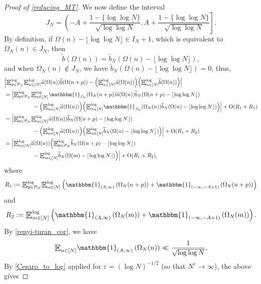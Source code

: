 \documentclass[letter,11pt]{article}
\theoremstyle{plain} %
\theoremstyle{definition} %
\theoremstyle{plain}
\theoremstyle{plain}
\theoremstyle{plain}
\numberwithin{equation}{section}
\newcommand{\Oh}{{\mathrm O}}
\renewcommand{\epsilon}{\varepsilon}
\newcommand{\E}{\raisebox{-0.4ex}{\scalebox{1.4}[1.3]{$\mathbb{E}$}}}
\newcommand{\Esub}[1]{\raisebox{-0.4ex}{\scalebox{1.4}[1.3]{$\mathbb{E}$}}\raisebox{-0.35ex}{\ensuremath{_{\scriptstyle #1}}}}
\newcommand{\logE}{{\E}^{\log}}
\newcommand{\1}{\mathbbm{1}}
\newcommand{\Pc}{\mathcal{P}}
\begin{document}
\begin{proof}[Proof of \cref{reducing_MT}]
We now define the interval 
$$J_N = \left(-A + \frac{1-\{\log\log{N}\}}{\sqrt{\log\log{N}}}, A + \frac{1-\{\log\log{N}\}}{\sqrt{\log\log{N}}}\right].$$
By definition, if $\Omega(n)-\lfloor\log\log{N}\rfloor\in I_N+1$,
which is equivalent to $\Omega_N(n)\in J_N$, then
$$\widetilde{b}(\Omega(n)) = \widetilde{b}_N(\Omega(n)-\lfloor\log\log{N}\rfloor),$$
and when $\Omega_N(n)\not\in J_N$, we have $\widetilde{b}_N(\Omega(n)-\lfloor\log\log{N}\rfloor) = 0$, 
thus,
\begin{align}\label{a_to_b}
     &\Big|\logE_{p\in\Pc_N}\logE_{n\in[N]} \widetilde{a}(\Omega(n))\widetilde{b}(\Omega(n+p)) - \Big(\logE_{n\in[N]}\widetilde{a}(\Omega(n))\Big)\Big(\logE_{n\in[N]}\widetilde{b}(\Omega(n))\Big)\Big| \notag \\
     & = \Big|\logE_{p\in\Pc_N}\logE_{n\in[N]}\1_{J_N}(\Omega_N(n+p))\widetilde{a}(\Omega(n))\widetilde{b}_N(\Omega(n+p)-\lfloor\log\log{N}\rfloor) \notag \\
     & \hspace*{1.8cm} - \Big(\logE_{n\in[N]}\widetilde{a}(\Omega(n))\Big)\Big(\logE_{n\in[N]}\1_{J_N}(\Omega_N(n))\widetilde{b}_N(\Omega(n)-\lfloor\log\log{N}\rfloor)\Big)\Big| 
     + \Oh(R_1 + R_2) \notag \\
     & = \Big|\logE_{p\in\Pc_N}\logE_{n\in[N]}\widetilde{a}(\Omega(n))\widetilde{b}_N(\Omega(n+p)-\lfloor\log\log{N}\rfloor) \notag \\
     & \hspace*{1.8cm} - \Big(\logE_{n\in[N]}\widetilde{a}(\Omega(n))\Big)\Big(\logE_{n\in[N]}\widetilde{b}_N(\Omega(n)-\lfloor\log\log{N}\rfloor)\Big)\Big| 
     + \Oh(R_1 + R_2) \notag \\
     & = \Big|\logE_{n\in[N]}\widetilde{a}(\Omega(n))\Big(\logE_{p\in\Pc_N}\widetilde{b}_N(\Omega(n+p)-\lfloor\log\log{N}\rfloor) \notag \\
     & \hspace*{1.8cm} - \logE_{m\in[N]}\widetilde{b}_N(\Omega(m)-\lfloor\log\log{N}\rfloor)\Big)\Big| + \Oh(R_1+R_2),
\end{align}
where 
$$R_1 := \logE_{p\in\Pc_N}\logE_{n\in[N]} \left(\1_{(A,\infty)}\left(\Omega_N(n+p)\right) + \1_{(-\infty,-A+1)}\left(\Omega_N(n+p)\right)\right)$$
and 
$$R_2 := \logE_{m\in[N]} \left(\1_{(A,\infty)}\left(\Omega_N(m)\right) + \1_{(-\infty,-A+1)}\left(\Omega_N(m)\right)\right).$$
By \cref{renyi-turan_cor}, we have 
$$\Esub{n\in[N]} \1_{(A,\infty)}\left(\Omega_N(n)\right) \ll \frac{1}{\sqrt{\log\log{N}}}.$$
By \cref{Cesaro_to_log} applied for $\epsilon=(\log{N})^{-1/2}$ (so that $N^\epsilon\to\infty$), the above gives

\end{proof}
\end{document}
